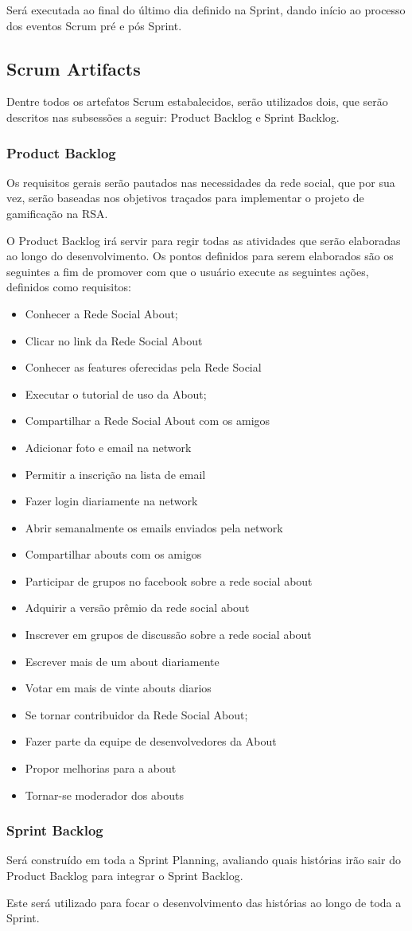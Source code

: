 Será executada ao final do último dia definido na Sprint, dando início ao processo dos eventos
Scrum pré e pós Sprint.

\subsection{Scrum Artifacts}
\label{subsec:scrumartifacts}
Dentre todos os artefatos Scrum estabalecidos, serão utilizados dois, que serão descritos nas
subsessões a seguir: Product Backlog e Sprint Backlog.

\subsubsection{Product Backlog}
\label{subsec:productbacklog}
Os requisitos gerais serão pautados nas necessidades da rede social, que por sua vez, serão
baseadas nos objetivos traçados para implementar o projeto de gamificação na RSA. 

O Product Backlog irá servir para regir todas as atividades que serão elaboradas ao longo do desenvolvimento. 
Os pontos definidos para serem elaborados são os seguintes a fim de promover
com que o usuário execute as seguintes ações, definidos como requisitos:

\begin{itemize}
    \item Conhecer a Rede Social About;
    \item Clicar no link da Rede Social About
    \item Conhecer as features oferecidas pela Rede Social
    \item Executar o tutorial de uso da About;
    \item Compartilhar a Rede Social About com os amigos
    \item Adicionar foto e email na network
    \item Permitir a inscrição na lista de email
    \item Fazer login diariamente na network
    \item Abrir semanalmente os emails enviados pela network
    \item Compartilhar abouts com os amigos
    \item Participar de grupos no facebook sobre a rede social about
    \item Adquirir a versão prêmio da rede social about
    \item Inscrever em grupos de discussão sobre a rede social about
    \item Escrever mais de um about diariamente
    \item Votar em mais de vinte abouts diarios
    \item Se tornar contribuidor da Rede Social About;
    \item Fazer parte da equipe de desenvolvedores da About
    \item Propor melhorias para a about
    \item Tornar-se moderador dos abouts
\end{itemize}


\subsubsection{Sprint Backlog}
\label{subsec:sprintbacklog}
Será construído em toda a Sprint Planning, avaliando quais histórias irão
sair do Product Backlog para integrar o Sprint Backlog.

Este será utilizado para focar o desenvolvimento das histórias ao longo de
toda a Sprint.
